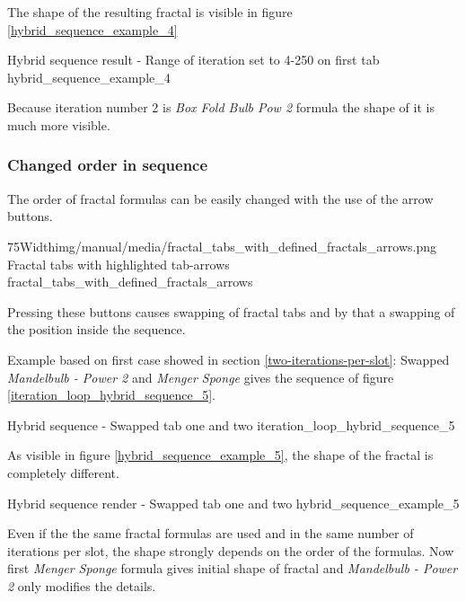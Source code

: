 The shape of the resulting fractal is visible in figure \ref{hybrid_sequence_example_4}

{Hybrid sequence result - Range of iteration set to 4-250 on first tab}
{hybrid_sequence_example_4}

Because iteration number 2 is \emph{Box Fold Bulb Pow 2} formula the shape of it is much more visible.

\subsubsection{Changed order in sequence}

The order of fractal formulas can be easily changed with the use of the arrow buttons.

\simpleImageWithCaption75Width{img/manual/media/fractal_tabs_with_defined_fractals_arrows.png}
{Fractal tabs with highlighted tab-arrows}
{fractal_tabs_with_defined_fractals_arrows}

Pressing these buttons causes swapping of fractal tabs and by that a swapping of the position inside the sequence.

Example based on first case showed in section \ref{two-iterations-per-slot}:
Swapped \emph{Mandelbulb - Power 2} and \emph{Menger Sponge} gives the sequence of figure \ref{iteration_loop_hybrid_sequence_5}.

{Hybrid sequence - Swapped tab one and two}
{iteration_loop_hybrid_sequence_5}

As visible in figure \ref{hybrid_sequence_example_5}, the shape of the fractal is completely different.

{Hybrid sequence render - Swapped tab one and two}
{hybrid_sequence_example_5}

Even if the the same fractal formulas are used and in the same number of iterations per slot, the shape strongly depends on the order of the formulas.
Now first \emph{Menger Sponge} formula gives initial shape of fractal and \emph{Mandelbulb - Power 2} only modifies the details.
